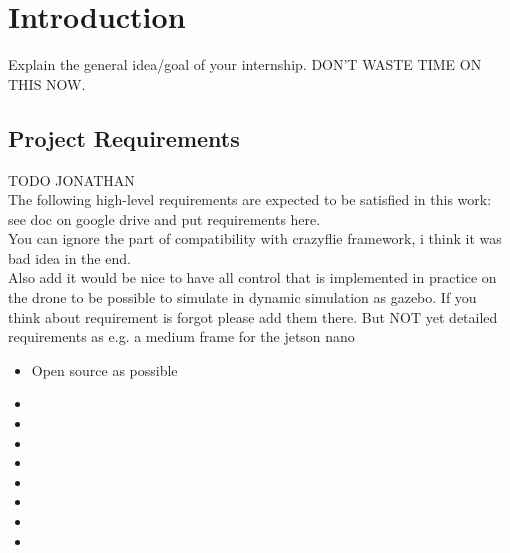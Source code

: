 \chapter{Introduction}
Explain the general idea/goal of your internship. DON'T WASTE TIME ON THIS NOW.
\section{Project Requirements}
 {\color{red}TODO JONATHAN\\}
The following high-level requirements are expected to be satisfied in this work: see doc on google drive and put requirements here. \\
You can ignore the part of compatibility with crazyflie framework, i think it was bad idea in the end.\\
Also add it would be nice to have all control that is implemented in practice on the drone to be possible to simulate in dynamic simulation as gazebo. If you think about requirement is forgot please add them there. But NOT yet detailed requirements as e.g. a medium frame for the jetson nano
\begin{itemize}
    \item Open source as possible
    \item
    \item
    \item
    \item
    \item
    \item
    \item
    \item
\end{itemize}
